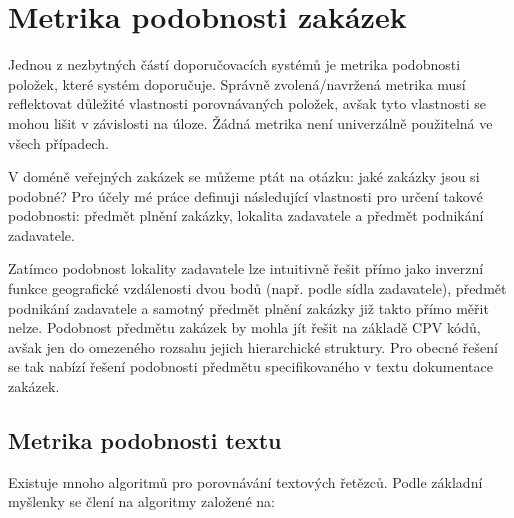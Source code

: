 \documentclass[thesis=M,czech]{FITthesis}[2019/12/23]
\begin{document}
\chapter{Metrika podobnosti zakázek}

Jednou z nezbytných částí doporučovacích systémů je metrika podobnosti položek, které systém doporučuje. Správně zvolená/navržená metrika musí reflektovat důležité vlastnosti porovnávaných položek, avšak tyto vlastnosti se mohou lišit v závislosti na úloze. Žádná metrika není univerzálně použitelná ve všech případech. 

V doméně veřejných zakázek se můžeme ptát na otázku: jaké zakázky jsou si podobné? Pro účely mé práce definuji následující vlastnosti pro určení takové podobnosti: předmět plnění zakázky, lokalita zadavatele a předmět podnikání zadavatele.

Zatímco podobnost lokality zadavatele lze intuitivně řešit přímo jako inverzní funkce geografické vzdálenosti dvou bodů (např. podle sídla zadavatele), předmět podnikání zadavatele a samotný předmět plnění zakázky již takto přímo měřit nelze. Podobnost předmětu zakázek by mohla jít řešit na základě CPV kódů, avšak jen do omezeného rozsahu jejich hierarchické struktury. Pro obecné řešení se tak nabízí řešení podobnosti předmětu specifikovaného v textu dokumentace zakázek.

\section{Metrika podobnosti textu}
\label{sec:text_sim_metrics}

Existuje mnoho algoritmů pro porovnávání textových řetězců. Podle základní myšlenky se člení na algoritmy založené na\cite{mayank2019}:
\end{document}
